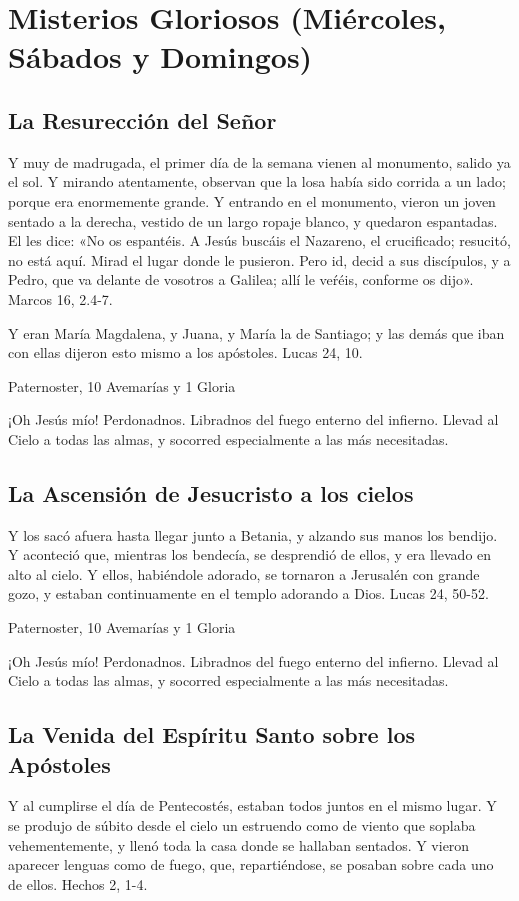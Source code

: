 \documentclass[a4paper,11pt, oneside]{report}
\begin{document}
    \section*{Misterios Gloriosos (Miércoles, Sábados y Domingos)}
      \subsection*{La Resurección del Señor}
        Y muy de madrugada, el primer día de la semana vienen al monumento, salido ya el sol. Y mirando atentamente, observan que la losa había
        sido corrida a un lado; porque era enormemente grande. Y entrando en el monumento, vieron un joven sentado a la derecha, vestido de un largo
        ropaje blanco, y quedaron espantadas. El les dice: «No os espantéis. A Jesús buscáis el Nazareno, el crucificado; resucitó, no está aquí. Mirad
        el lugar donde le pusieron. Pero id, decid a sus discípulos, y a Pedro, que va delante de vosotros a Galilea; allí le veŕéis, conforme os dijo».
        Marcos 16, 2.4-7.

        \medskip
        Y eran María Magdalena, y Juana, y María la de Santiago; y las demás que iban con ellas dijeron esto mismo a los apóstoles. 
        Lucas 24, 10.

         Paternoster, 10 Avemarías y 1 Gloria
        
        \medskip
        ¡Oh Jesús mío! Perdonadnos. Libradnos del fuego enterno del infierno. Llevad al Cielo a todas las almas, y socorred especialmente a las más necesitadas.
      
      \subsection*{La Ascensión de Jesucristo a los cielos}
        Y los sacó afuera hasta llegar junto a Betania, y alzando sus manos los bendijo. Y aconteció que, mientras los bendecía, se desprendió de ellos,
        y era llevado en alto al cielo. Y ellos, habiéndole adorado, se tornaron a Jerusalén con grande gozo, y estaban continuamente en el templo
        adorando a Dios. Lucas 24, 50-52.

         Paternoster, 10 Avemarías y 1 Gloria
        
        \medskip
        ¡Oh Jesús mío! Perdonadnos. Libradnos del fuego enterno del infierno. Llevad al Cielo a todas las almas, y socorred especialmente a las más necesitadas.
        
      \subsection*{La Venida del Espíritu Santo sobre los Apóstoles}
        Y al cumplirse el día de Pentecostés, estaban todos juntos en el mismo lugar. Y se produjo de súbito desde el cielo un estruendo como de viento
        que soplaba vehementemente, y llenó toda la casa donde se hallaban sentados. Y vieron aparecer lenguas como de fuego, que, repartiéndose, se 
        posaban sobre cada uno de ellos. Hechos 2, 1-4.
\end{document}
